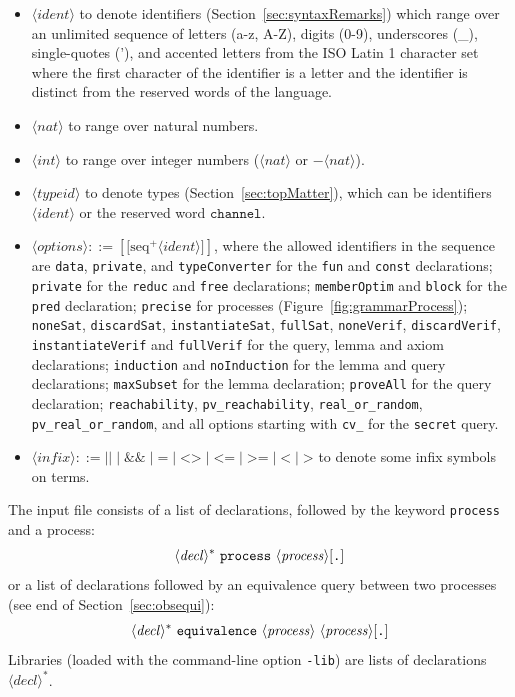 \documentclass{book}
\newcommand{\nonterm}[1]{\langle\mathit{#1}\rangle}
\newcommand{\neseq}[1]{\textrm{seq}^+\nonterm{#1}}
\begin{document}
\begin{itemize}
\item $\nonterm{ident}$ to denote identifiers (Section~\ref{sec:syntaxRemarks}) which range over an unlimited sequence of letters (a-z, A-Z), digits (0-9), underscores (\_), single-quotes ('), and accented letters from the ISO Latin 1 character set where the first character of the identifier is a letter and the identifier is distinct from the reserved words of the language.

\item $\nonterm{nat}$ to range over natural numbers.

\item $\nonterm{int}$ to range over integer numbers ($\nonterm{nat}$ or $-\nonterm{nat}$).

\item $\nonterm{typeid}$ to denote types
  (Section~\ref{sec:topMatter}), which can be identifiers
  $\nonterm{ident}$ or the reserved word $\texttt{channel}$.

\item $\nonterm{options} ::= [\texttt{[}\neseq{ident}\texttt{]}]$, where the allowed identifiers in the sequence are
\texttt{data}, \texttt{private}, and \texttt{typeConverter} for the \texttt{fun} and \texttt{const} declarations;
\texttt{private} for the \texttt{reduc} and \texttt{free} declarations;
\texttt{memberOptim} and \texttt{block} for the \texttt{pred} declaration; \texttt{precise} for processes (Figure~\ref{fig:grammarProcess}); \texttt{noneSat}, \texttt{discardSat}, \texttt{instantiateSat}, \texttt{fullSat}, \texttt{noneVerif}, \texttt{discardVerif}, \texttt{instantiateVerif} and \texttt{fullVerif} for the query, lemma and axiom declarations; \texttt{induction} and \texttt{noInduction} for the lemma and query declarations; \texttt{maxSubset} for the lemma declaration; \texttt{proveAll} for the query declaration; \texttt{reachability}, \texttt{pv\_reachability}, \texttt{real\_or\_random}, \texttt{pv\_real\_or\_random}, and all options starting with \texttt{cv\_} for the \texttt{secret} query.

\item $\nonterm{infix} ::= \texttt{||} \mid \texttt{\&\&} \mid \texttt{=} \mid \texttt{<>} \mid \texttt{<=} \mid\texttt{>=} \mid\texttt{<} \mid \texttt{>}$ to denote some infix symbols on terms.
\end{itemize}

\noindent The input file consists of a list of declarations, followed by the keyword \texttt{process} and a process:
\[
	\nonterm{decl}^*\ {\tt process}\ \nonterm{process}[\texttt{.}]
\]
or a list of declarations followed by an equivalence query between two processes (see end of Section~\ref{sec:obsequi}):
\[
	\nonterm{decl}^*\ {\tt equivalence}\ \nonterm{process}\ \nonterm{process}[\texttt{.}]
\]
Libraries (loaded with the command-line option {\tt -lib}) are
lists of declarations $\nonterm{decl}^*$.
\end{document}
